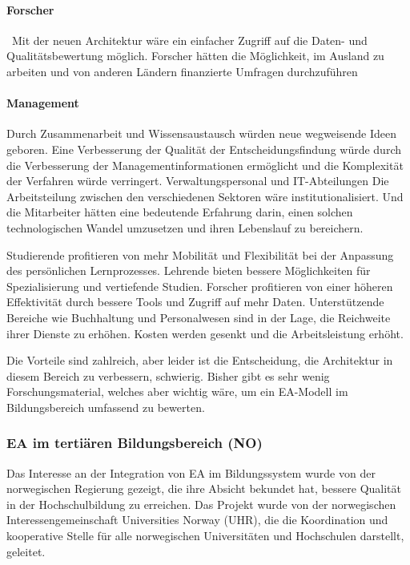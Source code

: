\documentclass[
	doc,
	a4paper,
	helv
	]{apa6}
\begin{document}
\paragraph{Forscher}
 Mit der neuen Architektur wäre ein einfacher Zugriff auf die Daten- und Qualitätsbewertung möglich. Forscher hätten die Möglichkeit, im Ausland zu arbeiten und von anderen Ländern finanzierte Umfragen durchzuführen
\paragraph{Management}
Durch Zusammenarbeit und Wissensaustausch würden neue wegweisende Ideen geboren. Eine Verbesserung der Qualität der Entscheidungsfindung würde durch die Verbesserung der Managementinformationen ermöglicht und die Komplexität der Verfahren würde verringert.
Verwaltungspersonal und IT-Abteilungen
Die Arbeitsteilung zwischen den verschiedenen Sektoren wäre institutionalisiert. Und die Mitarbeiter hätten eine bedeutende Erfahrung darin, einen solchen technologischen Wandel umzusetzen und ihren Lebenslauf zu bereichern.

Studierende profitieren von mehr Mobilität und Flexibilität bei der Anpassung des persönlichen Lernprozesses. Lehrende bieten bessere Möglichkeiten für Spezialisierung und vertiefende Studien. Forscher profitieren von einer höheren Effektivität durch bessere Tools und Zugriff auf mehr Daten. Unterstützende Bereiche wie Buchhaltung und Personalwesen sind in der Lage, die Reichweite ihrer Dienste zu erhöhen. Kosten werden gesenkt und die Arbeitsleistung erhöht.

Die Vorteile sind zahlreich, aber leider ist die Entscheidung, die Architektur in diesem Bereich zu verbessern, schwierig. Bisher gibt es sehr wenig Forschungsmaterial, welches aber wichtig wäre, um ein EA-Modell im Bildungsbereich umfassend zu bewerten.

\subsubsection{EA im tertiären Bildungsbereich (NO)}

Das Interesse an der Integration von EA im Bildungssystem wurde von der norwegischen Regierung gezeigt, die ihre Absicht bekundet hat, bessere Qualität in der Hochschulbildung zu erreichen. Das Projekt  wurde von der norwegischen Interessengemeinschaft Universities Norway (UHR), die die Koordination und kooperative Stelle für alle norwegischen Universitäten und Hochschulen darstellt, geleitet.
\end{document}
